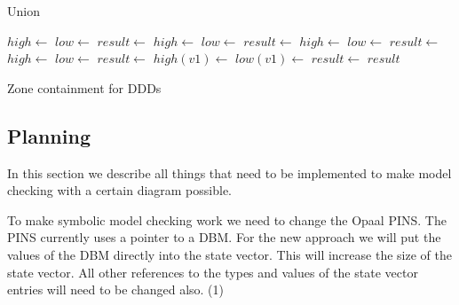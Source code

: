 \begin{algorithm}
\begin{algorithmic}[1]
\caption{Union}\label{alg:union}
		\State $high \gets$ 
		\State $low \gets$ 
		\State $result \gets$  
		\State $high \gets$ 
		\State $low \gets$ 
		\State $result \gets$  
		\State $high \gets$ 
		\State $low \gets$ 
		\State $result \gets$ 
		\State $high \gets$ 
		\State $low \gets$ 
		\State $result \gets$ 
		\State $high(v1) \gets$ 
		\State $low(v1) \gets$ 
		\State $result \gets$ 
	\EndIf
	\State \Return $result$
\EndProcedure
\end{algorithmic}
\end{algorithm}

\begin{algorithm}
\caption{Zone containment for DDDs}\label{alg:contain}
\begin{algorithmic}[1]
		\State{} 
	\EndIf
\EndProcedure
\end{algorithmic}
\end{algorithm}

\subsection{Planning}
In this section we describe all things that need to be implemented to make model checking with a certain diagram possible. 

To make symbolic model checking work we need to change the Opaal PINS. The PINS currently uses a pointer to a DBM. For the new approach we will put the values of the DBM directly into the state vector. This will increase the size of the state vector. All other references to the types and values of the state vector entries will need to be changed also. (1)

